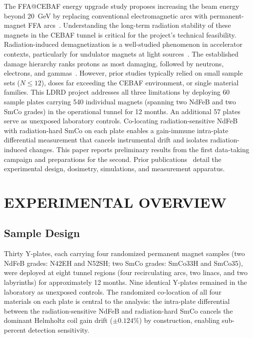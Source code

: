\documentclass[a4paper,
               ]{jacow}
\begin{document}
The FFA@CEBAF energy upgrade study proposes increasing the beam energy beyond \SI{20}{GeV} by replacing conventional electromagnetic arcs with permanent-magnet FFA arcs~\cite{Khan:ipac2024-mopr08}. Understanding the long-term radiation stability of these magnets in the CEBAF tunnel is critical for the project's technical feasibility. Radiation-induced demagnetization is a well-studied phenomenon in accelerator contexts, particularly for undulator magnets at light sources~\cite{Bizen:2016}. The established damage hierarchy ranks protons as most damaging, followed by neutrons, electrons, and gammas~\cite{Shepherd:Radiation, Samin:2018}. However, prior studies typically relied on small sample sets ($N \leq 12$), doses far exceeding the CEBAF environment, or single material families. This LDRD project addresses all three limitations by deploying 60 sample plates carrying 540 individual magnets (spanning two NdFeB and two SmCo grades) in the operational tunnel for 12 months. An additional 57 plates serve as unexposed laboratory controls. Co-locating radiation-sensitive NdFeB with radiation-hard SmCo on each plate enables a gain-immune intra-plate differential measurement that cancels instrumental drift and isolates radiation-induced changes. This paper reports preliminary results from the first data-taking campaign and preparations for the second. Prior publications~\cite{Bodenstein:ipac2024-thps58, Bodenstein:ipac2025-thpb093, Bodenstein:napac25-wean02} detail the experimental design, dosimetry, simulations, and measurement apparatus.

\section{EXPERIMENTAL OVERVIEW}

\subsection{Sample Design}

Thirty Y-plates, each carrying four randomized permanent magnet samples (two NdFeB grades: N42EH and N52SH; two SmCo grades: SmCo33H and SmCo35), were deployed at eight tunnel regions (four recirculating arcs, two linacs, and two labyrinths) for approximately 12 months. Nine identical Y-plates remained in the laboratory as unexposed controls. The randomized co-location of all four materials on each plate is central to the analysis: the intra-plate differential between the radiation-sensitive NdFeB and radiation-hard SmCo cancels the dominant Helmholtz coil gain drift (${\pm}0.124\%$) by construction, enabling sub-percent detection sensitivity.
\end{document}
